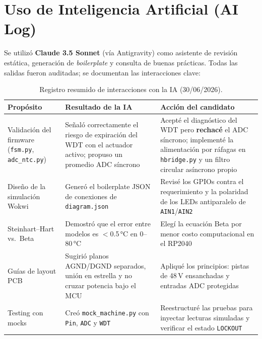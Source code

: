 \documentclass[11pt,letterpaper]{article}
\begin{document}
\section{Uso de Inteligencia Artificial (AI Log)}
Se utilizó \textbf{Claude 3.5 Sonnet} (vía Antigravity) como asistente de revisión
estática, generación de \emph{boilerplate} y consulta de buenas prácticas. Todas las
salidas fueron auditadas; se documentan las interacciones clave:

\begin{table}[H]
\centering\footnotesize
{}
\begin{tabularx}{\textwidth}{L{2.6cm} X X}
\toprule
{}\color{white}\textbf{Propósito} & \color{white}\textbf{Resultado de la IA} & \color{white}\textbf{Acción del candidato} \\
\midrule
Validación del firmware (\texttt{fsm.py}, \texttt{adc\_ntc.py}) & Señaló correctamente el riesgo de expiración del WDT con el actuador activo; propuso un promedio ADC síncrono & Acepté el diagnóstico del WDT pero \textbf{rechacé} el ADC síncrono; implementé la alimentación por ráfagas en \texttt{hbridge.py} y un filtro circular asíncrono propio \\
Diseño de la simulación Wokwi & Generó el boilerplate JSON de conexiones de \texttt{diagram.json} & Revisé los GPIOs contra el requerimiento y la polaridad de los LEDs antiparalelo de \texttt{AIN1}/\texttt{AIN2} \\
Steinhart--Hart vs.\ Beta & Demostró que el error entre modelos es $<$0.5\,°C en 0--80\,°C & Elegí la ecuación Beta por menor costo computacional en el RP2040 \\
Guías de layout PCB & Sugirió planos AGND/DGND separados, unión en estrella y no cruzar potencia bajo el MCU & Apliqué los principios: pistas de 48\,V ensanchadas y entradas ADC protegidas \\
Testing con mocks & Creó \texttt{mock\_machine.py} con \texttt{Pin}, \texttt{ADC} y \texttt{WDT} & Reestructuré las pruebas para inyectar lecturas simuladas y verificar el estado \texttt{LOCKOUT} \\
\bottomrule
\end{tabularx}
\caption{Registro resumido de interacciones con la IA (30/06/2026).}
\end{table}
\end{document}
